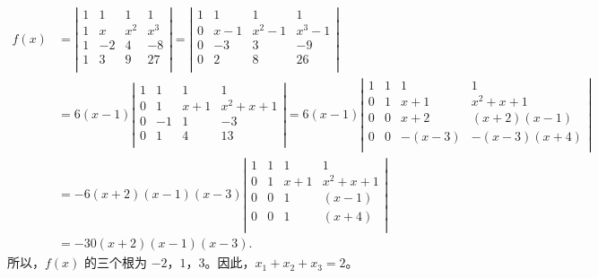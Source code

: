 \begin{enumerate}[1~]
\begin{enumerate}[1.~]
\begin{solution}
\begin{align*}
f\left( x \right) &=\left| \begin{matrix}
	1&		1&		1&		1\\
	1&		x&		x^2&		x^3\\
	1&		-2&		4&		-8\\
	1&		3&		9&		27\\
\end{matrix} \right|=\left| \begin{matrix}
	1&		1&		1&		1\\
	0&		x-1&		x^2-1&		x^3-1\\
	0&		-3&		3&		-9\\
	0&		2&		8&		26\\
\end{matrix} \right|\\
&=6\left( x-1 \right) \left| \begin{matrix}
	1&		1&		1&		1\\
	0&		1&		x+1&		x^2+x+1\\
	0&		-1&		1&		-3\\
	0&		1&		4&		13\\
\end{matrix} \right|
=6\left( x-1 \right) \left| \begin{matrix}
	1&		1&		1&		1\\
	0&		1&		x+1&		x^2+x+1\\
	0&		0&		x+2&		\left( x+2 \right) \left( x-1 \right)\\
	0&		0&		-\left( x-3 \right)&		-\left( x-3 \right) \left( x+4 \right)\\
\end{matrix} \right|\\
&=-6\left( x+2 \right) \left( x-1 \right) \left( x-3 \right) \left| \begin{matrix}
	1&		1&		1&		1\\
	0&		1&		x+1&		x^2+x+1\\
	0&		0&		1&		\left( x-1 \right)\\
	0&		0&		1&		\left( x+4 \right)\\
\end{matrix} \right|\\
&=-30\left( x+2 \right) \left( x-1 \right) \left( x-3 \right).
\end{align*}
所以，$f(x)$ 的三个根为 $-2$，$1$，$3$。因此，$x_1+x_2+x_3=2$。
\end{solution}


\end{enumerate}
\end{enumerate}
